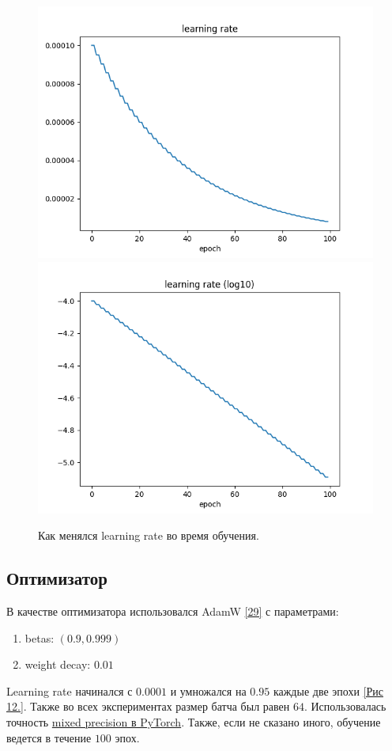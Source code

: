 \begin{figure}
    \centering
    \includegraphics[scale=0.5]{./images/lr.png} 
    \includegraphics[scale=0.5]{./images/lr_log.png}
    \caption{\protect\hypertarget{image11}{Как менялся learning rate во время обучения.}}
\end{figure}

\subsection{Оптимизатор}
В качестве оптимизатора использовался AdamW \hyperlink{cite.Los17}{[29]} с параметрами:
\begin{enumerate}
\item betas: $(0.9, 0.999)$
\item weight decay: $0.01$
\end{enumerate}
Learning rate начинался с $0.0001$ и умножался на $0.95$ каждые две эпохи \hyperlink{image12}{[Рис 12.]}. Также во всех экспериментах размер батча был равен $64$. Использовалась точность \href{https://pytorch.org/blog/what-every-user-should-know-about-mixed-precision-training-in-pytorch/}{mixed precision в PyTorch}. Также, если не сказано иного, обучение ведется в течение $100$ эпох.

